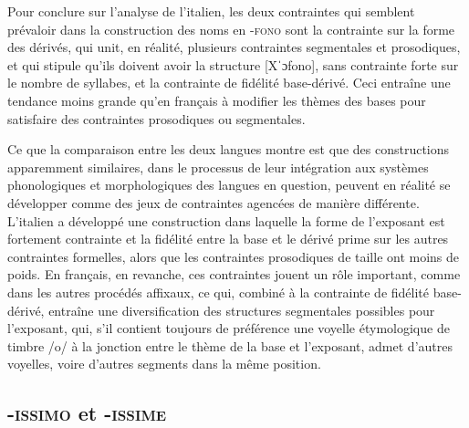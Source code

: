 \documentclass[output=paper]{langsci/langscibook}
\begin{document}
Pour conclure sur l'analyse de l'italien, les deux contraintes qui
semblent prévaloir dans la construction des noms en -\textsc{fono} sont
la contrainte sur la forme des dérivés, qui unit, en réalité, plusieurs
contraintes segmentales et prosodiques, et qui stipule qu'ils doivent
avoir la structure {[}Xˈɔfono{]}, sans contrainte forte sur le nombre de
syllabes, et la contrainte de fidélité base-dérivé. Ceci entraîne une
tendance moins grande qu'en français à modifier les thèmes des bases
pour satisfaire des contraintes prosodiques ou segmentales.

Ce que la comparaison entre les deux langues montre est que des
constructions apparemment similaires, dans le processus de leur
intégration aux systèmes phonologiques et morphologiques des langues en
question, peuvent en réalité se développer comme des jeux de contraintes
agencées de manière différente. L'italien a développé une construction
dans laquelle la forme de l'exposant est fortement contrainte et la
fidélité entre la base et le dérivé prime sur les autres contraintes
formelles, alors que les contraintes prosodiques de taille ont moins de
poids. En français, en revanche, ces contraintes jouent un rôle
important, comme dans les autres procédés affixaux, ce qui, combiné à la
contrainte de fidélité base-dérivé, entraîne une diversification des
structures segmentales possibles pour l'exposant, qui, s'il contient
toujours de préférence une voyelle étymologique de timbre /o/ à la
jonction entre le thème de la base et l'exposant, admet d'autres
voyelles, voire d'autres segments dans la même position.

\subsection{-\textsc{issimo} et -\textsc{issime}}
\end{document}
